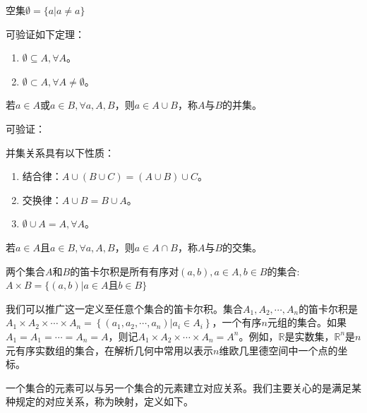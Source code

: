 \documentclass[main.tex]{subfiles}
\begin{document}
\begin{definition}[空集]
空集$\emptyset = \{a|a\neq a\}$
\end{definition}

可验证如下定理：

\begin{theorem}
\begin{enumerate}
    \item $\emptyset\subseteq A,\forall A$。
    \item $\emptyset\subset A,\forall A\neq\emptyset$。
\end{enumerate}
\end{theorem}

\begin{definition}[并集]
若$a\in A$或$a\in B,\forall a,A,B$，则$a\in A\cup B$，称$A$与$B$的并集。
\end{definition}

可验证：
\begin{theorem}
并集关系具有以下性质：
\begin{enumerate}
    \item 结合律：$A\cup\left(B\cup C\right)=\left(A\cup B\right)\cup C$。
    \item 交换律：$A\cup B=B\cup A$。
    \item $\emptyset\cup A=A,\forall A$。
\end{enumerate}
\end{theorem}

\begin{definition}[交集]
若$a\in A$且$a\in B,\forall a,A,B$，则$a\in A\cap B$，称$A$与$B$的交集。
\end{definition}

\begin{definition}[笛卡尔积]
两个集合$A$和$B$的笛卡尔积是所有有序对$\left(a,b\right),a\in A,b\in B$的集合: $A\times B=\{\left(a,b\right)|a\in A\text{且}b\in B\}$
\end{definition}

我们可以推广这一定义至任意个集合的笛卡尔积。集合$A_1,A_2,\cdots,A_n$的笛卡尔积是$A_1\times A_2\times\cdots\times A_n=\left\{\left(a_1,a_2,\cdots,a_n\right)|a_i\in A_i\right\}$，一个有序$n$元组的集合。如果$A_1=A_1=\cdots=A_n=A$，则记$A_1\times A_2\times\cdots\times A_n=A^n$。例如，$\mathbb{R}$是实数集，$\mathbb{R}^n$是$n$元有序实数组的集合，在解析几何中常用以表示$n$维欧几里德空间中一个点的坐标。

一个集合的元素可以与另一个集合的元素建立对应关系。我们主要关心的是满足某种规定的对应关系，称为映射，定义如下。
\end{document}
